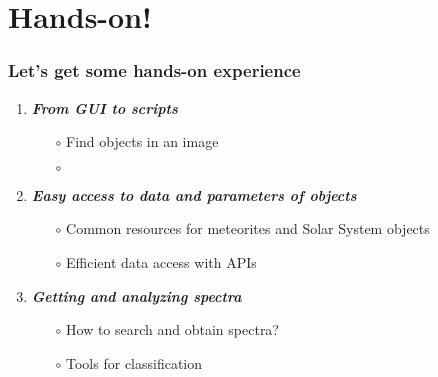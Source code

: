 \section{Hands-on!}


\begin{frame}
  \frametitle{Let's get some hands-on experience}

  \begin{enumerate}[<.->]
    \item \emph{\bf From GUI to scripts}
      \begin{itemize}[<.->]
        \item[$\circ$] Find objects in an image
        \item[$\circ$] 
      \end{itemize}
  
    \vspace{0.5em}
  \item \emph{\bf Easy access to data and parameters of objects}
      \begin{itemize}[<.->]
        \item[$\circ$] Common resources for meteorites and Solar System objects
        \item[$\circ$] Efficient data access with APIs
      \end{itemize}
  
    \vspace{0.5em}
    \item \emph{\bf Getting and analyzing spectra}
      \begin{itemize}[<.->]
        \item[$\circ$] How to search and obtain spectra?
        \item[$\circ$] Tools for classification
      \end{itemize}

  \end{enumerate}

 \end{frame}
